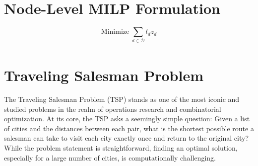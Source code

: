 \section{Node-Level MILP Formulation}
%
%
%
%
\[
\text{Minimize} \ \sum_{d \in \mathcal{D}} l_d z_d
\]
%
\begin{align*}
\end{align*}

%
%
%
%

\section{Traveling Salesman Problem}
\label{sec:tsp-models}
The Traveling Salesman Problem (TSP) stands as one of the most iconic and studied problems in the realm of operations research and combinatorial optimization. At its core, the TSP asks a seemingly simple question: Given a list of cities and the distances between each pair, what is the shortest possible route a salesman can take to visit each city exactly once and return to the original city? While the problem statement is straightforward, finding an optimal solution, especially for a large number of cities, is computationally challenging.

